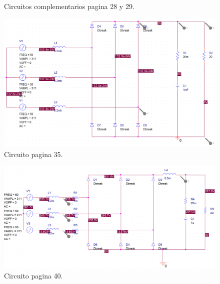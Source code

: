 ﻿\documentclass[letterpaper]{article}
\begin{document}
\begin{large}
\begin{figure}[htbp]
            \caption{Circuitos complementarios pagina 28 y 29.}
            \label{fig:cirp28y29}
        \end{figure}
        \begin{figure}[htbp]
            \centering
            \includegraphics[scale=0.5]{cirp35.png}
            \caption{Circuito pagina 35.}
            \label{fig:cirp35}
        \end{figure}
        \begin{figure}[htbp]
            \centering
            \includegraphics[scale=0.4]{cirp40.png}
            \caption{Circuito pagina 40.}
            \label{fig:cir40}
        \end{figure}
    \end{large}
    \newpage
    \vspace{1.2cm}
\end{document}
